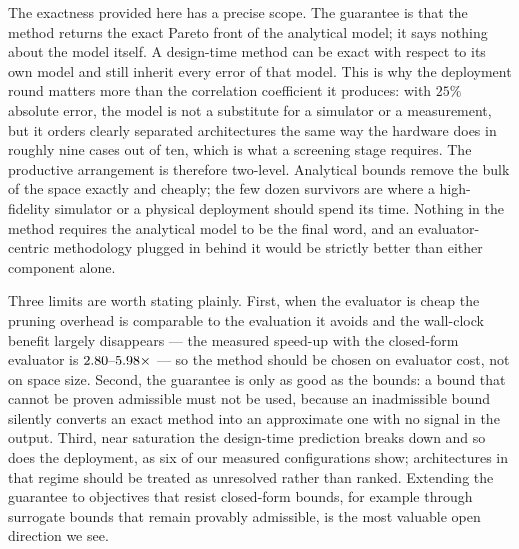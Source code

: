 The exactness provided here has a precise scope. The guarantee is that the method returns the exact Pareto front of the
analytical model; it says nothing about the model itself. A design-time method can be
exact with respect to its own model and still inherit every error of that model. This is
why the deployment round matters more than the correlation coefficient it produces: with
$25\%$ absolute error, the model is not a substitute for a simulator or a measurement,
but it orders clearly separated architectures the same way the hardware does in roughly
nine cases out of ten, which is what a screening stage requires. The productive
arrangement is therefore two-level. Analytical bounds remove the bulk of the space
exactly and cheaply; the few dozen survivors are where a high-fidelity simulator or a
physical deployment should spend its time. Nothing in the method requires the analytical
model to be the final word, and an evaluator-centric methodology plugged in behind it
would be strictly better than either component alone.

Three limits are worth stating plainly. First, when the evaluator is cheap the pruning
overhead is comparable to the evaluation it avoids and the wall-clock benefit largely
disappears --- the measured speed-up with the closed-form evaluator is $2.80\text{--}5.98\times$
--- so the method should be chosen on evaluator cost, not on space size. Second, the
guarantee is only as good as the bounds: a bound that cannot be proven admissible must
not be used, because an inadmissible bound silently converts an exact method into an
approximate one with no signal in the output. Third, near saturation the design-time
prediction breaks down and so does the deployment, as six of our measured configurations
show; architectures in that regime should be treated as unresolved rather than ranked.
Extending the guarantee to objectives that resist closed-form bounds, for example through
surrogate bounds that remain provably admissible, is the most valuable open direction we
see.
